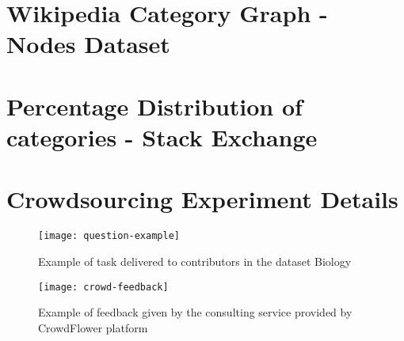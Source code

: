 \begin{appendices}
  \chapter{Wikipedia Category Graph - Nodes Dataset}
  \label{app:dataset-categories}
  


\chapter{Percentage Distribution of categories - Stack Exchange}
  \label{app:percentagem-distribution}
  

\chapter{Crowdsourcing Experiment Details}

\begin{figure}[!h]
\centering
  \texttt{[image: question-example]}
  \caption{Example of task delivered to contributors in the dataset Biology}
  \label{fig:example-question}
\end{figure}


\begin{figure}[!h]
\centering
  \texttt{[image: crowd-feedback]}
  \caption{Example of feedback given by the consulting service provided by CrowdFlower platform}
  \label{fig:example-feedback}
\end{figure}


\end{appendices}